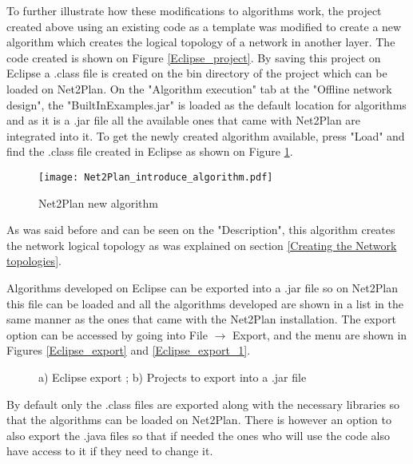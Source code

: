 	
	To further illustrate how these modifications to algorithms work, the project created above using an existing code as a template was modified to create a new algorithm which creates the logical topology of a network in another layer.
	\newpage
	 The code created is shown on Figure \ref{Eclipse_project}.
	By saving this project on Eclipse a .class file is created on the bin directory of the project which can be loaded on Net2Plan. On the "Algorithm execution" tab at the "Offline network design", the "BuiltInExamples.jar" is loaded as the default location for algorithms and as it is a .jar file all the available ones that came with Net2Plan are integrated into it.	To get the newly created algorithm available, press "Load" and find the .class file created in Eclipse as shown on Figure \ref{Net2Plan_introduce_algorithm}.
	
	\begin{figure}[h!]
		\centering
		\texttt{[image: Net2Plan\_introduce\_algorithm.pdf]}
		\caption{Net2Plan new algorithm}
		\label{Net2Plan_introduce_algorithm}
	\end{figure}
			
				
			
	As was said before and can be seen on the "Description", this algorithm creates the network logical topology as was explained on section \ref{Creating the Network topologies}.
			
	Algorithms developed on Eclipse can be exported into a .jar file so on Net2Plan this file can be loaded and all the algorithms developed are shown in a list in the same manner as the ones that came with the Net2Plan installation. The export option can be accessed by going into File $\rightarrow$ Export, and the menu are shown in Figures \ref{Eclipse_export} and \ref{Eclipse_export_1}.
	
	\begin{figure}[!h]
		\centering
		\caption{a) Eclipse export ; b) Projects to export into a .jar file}
	\end{figure}
	
	By default only the .class files are exported along with the necessary libraries so that the algorithms can be loaded on Net2Plan. There is however an option to also export the .java files so that if needed the ones who will use the code also have access to it if they need to change it.
	 						
